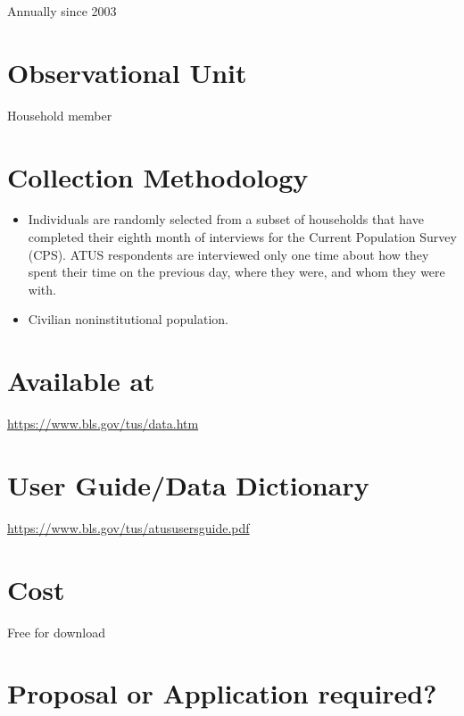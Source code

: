\documentclass[
]{book}
\providecommand{\tightlist}{%
  \setlength{\itemsep}{0pt}\setlength{\parskip}{0pt}}
\begin{document}
Annually since 2003

\hypertarget{observational-unit-7}{%
\section{Observational Unit}\label{observational-unit-7}}

Household member

\hypertarget{collection-methodology-7}{%
\section{Collection Methodology}\label{collection-methodology-7}}

\begin{itemize}
\tightlist
\item
  Individuals are randomly selected from a subset of households that have completed their eighth month of interviews for the Current Population Survey (CPS). ATUS respondents are interviewed only one time about how they spent their time on the previous day, where they were, and whom they were with.
\item
  Civilian noninstitutional population.
\end{itemize}

\hypertarget{available-at-7}{%
\section{Available at}\label{available-at-7}}

\url{https://www.bls.gov/tus/data.htm}

\hypertarget{user-guidedata-dictionary-7}{%
\section{User Guide/Data Dictionary}\label{user-guidedata-dictionary-7}}

\url{https://www.bls.gov/tus/atususersguide.pdf}

\hypertarget{cost-7}{%
\section{Cost}\label{cost-7}}

Free for download

\hypertarget{proposal-or-application-required-7}{%
\section{Proposal or Application required?}\label{proposal-or-application-required-7}}
\end{document}
